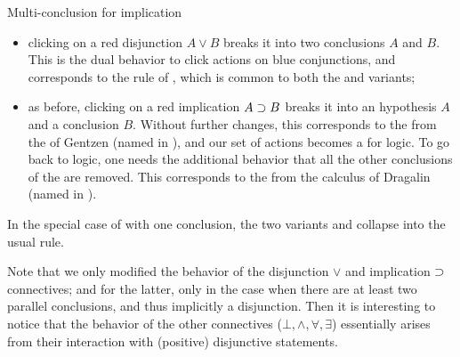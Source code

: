\begin{marginfigure}
  \caption{Multi-conclusion  for implication}
\end{marginfigure}

\begin{itemize}
  \item clicking on a red disjunction $A \lor B$ breaks it into two conclusions
  $A$ and $B$. This is the dual behavior to click actions on blue conjunctions,
  and corresponds to the {} rule of , which is
  common to both the  and  variants;
  \item as before, clicking on a red implication $A \supset B$ breaks it into an
  hypothesis $A$ and a conclusion $B$. Without further changes, this corresponds
  to the  from the    of Gentzen (named {} in
  ), and our set of actions becomes a 
  for  logic. To go back to  logic, one needs
  the additional behavior that all the other conclusions of the  are
  removed. This corresponds to the  from the
   calculus of Dragalin (named {} in
  ).
\end{itemize}

\begin{remark}
  In the special case of   with one conclusion, the two
  variants {} and {} collapse into the usual
  {} rule.
\end{remark}
Note that we only modified the behavior of the disjunction $\lor$ and
implication $\supset$ connectives; and for the latter, only in the case when there
are at least two parallel conclusions, and thus implicitly a disjunction. Then
it is interesting to notice that the  behavior of the other connectives
($\bot, \land, \forall, \exists$) essentially arises from their interaction with
(positive) disjunctive statements.

